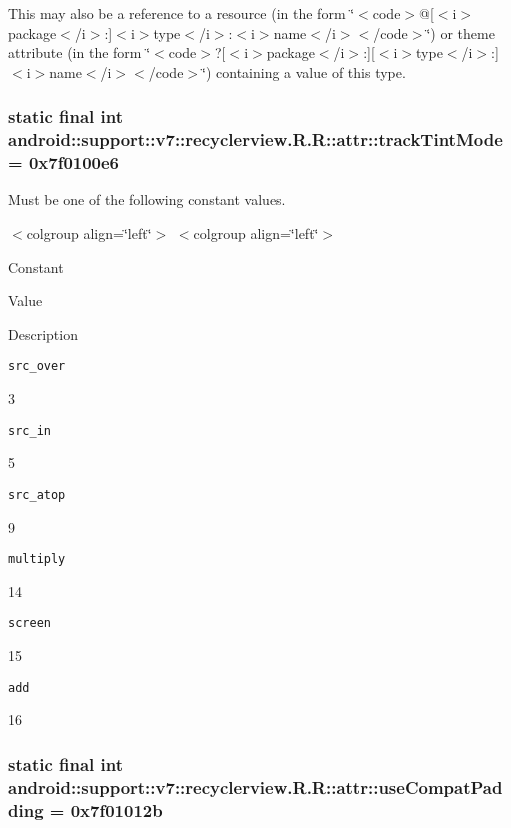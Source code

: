 This may also be a reference to a resource (in the form \char`\"{}$<$code$>$@\mbox{[}$<$i$>$package$<$/i$>$:\mbox{]}$<$i$>$type$<$/i$>$:$<$i$>$name$<$/i$>$$<$/code$>$\char`\"{}) or theme attribute (in the form \char`\"{}$<$code$>$?\mbox{[}$<$i$>$package$<$/i$>$:\mbox{]}\mbox{[}$<$i$>$type$<$/i$>$:\mbox{]}$<$i$>$name$<$/i$>$$<$/code$>$\char`\"{}) containing a value of this type. \hypertarget{classandroid_1_1support_1_1v7_1_1recyclerview_1_1_r_1_1attr_a3da788d6d59d3a3a38e32d192ff8178}{
\subsubsection[{trackTintMode}]{\setlength{\rightskip}{0pt plus 5cm}static final int android::support::v7::recyclerview.R.R::attr::trackTintMode = 0x7f0100e6}}
\label{classandroid_1_1support_1_1v7_1_1recyclerview_1_1_r_1_1attr_a3da788d6d59d3a3a38e32d192ff8178}


Must be one of the following constant values. \begin{TabularC}{0}
\hline
\end{TabularC}
$<$colgroup align=\char`\"{}left\char`\"{}$>$ $<$colgroup align=\char`\"{}left\char`\"{}$>$ 

Constant

Value

Description 

{\tt src\_\-over}

3

{\tt src\_\-in}

5

{\tt src\_\-atop}

9

{\tt multiply}

14

{\tt screen}

15

{\tt add}

16\hypertarget{classandroid_1_1support_1_1v7_1_1recyclerview_1_1_r_1_1attr_606d9e323cd79fc981c3e726a4df97a2}{
\subsubsection[{useCompatPadding}]{\setlength{\rightskip}{0pt plus 5cm}static final int android::support::v7::recyclerview.R.R::attr::useCompatPadding = 0x7f01012b}}
\label{classandroid_1_1support_1_1v7_1_1recyclerview_1_1_r_1_1attr_606d9e323cd79fc981c3e726a4df97a2}


